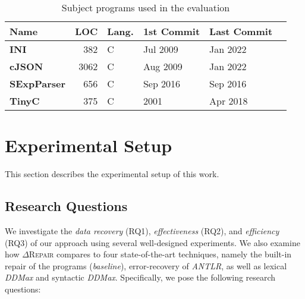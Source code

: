 \documentclass[acmsmall,screen,review,anonymous]{acmart}
\newcommand{\approach}{\textsc{$\Delta$Repair}\xspace}
\newcommand{\ddmax}{\textit{DDMax}\xspace}
\begin{document}
\begin{table}[!tbp]\centering
\caption{Subject programs used in the evaluation}
\begin{tabular}{|l | r | l | l | l | l |}
\hline
\textbf{Name} & \textbf{LOC} & \textbf{Lang.} & \textbf{1{st} Commit} & \textbf{Last Commit} \\
\hline
\textbf{INI} & 382 & C & Jul 2009 & Jan 2022\\
\textbf{cJSON} & 3062 & C & Aug 2009 & Jan 2022\\
\textbf{SExpParser} & 656 & C & Sep 2016 & Sep 2016\\
\textbf{TinyC} & 375 & C & 2001 & Apr 2018\\
\hline
\end{tabular}
\label{tab:subject-programs}
\end{table}








\section{Experimental Setup}
\label{sec:experimental-setup}



This section describes the experimental setup of this work.






\subsection{Research Questions} 
We investigate the \textit{data recovery} (RQ1), \textit{effectiveness} (RQ2), 
and \textit{efficiency} (RQ3) of our approach using several well-designed experiments. %
We also examine how \approach compares to four state-of-the-art techniques, 
namely the built-in repair of the programs (\textit{baseline}), error-recovery of \textit{ANTLR}, as well as 
lexical \ddmax and syntactic 
\ddmax. Specifically, we pose the following research questions:
\end{document}
